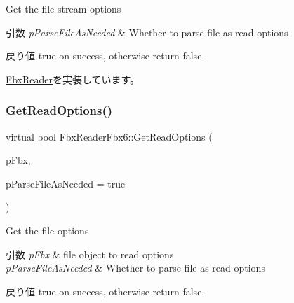Get the file stream options 
\begin{DoxyParams}{引数}
{\em p\+Parse\+File\+As\+Needed} & Whether to parse file as read options \\
\hline
\end{DoxyParams}
\begin{DoxyReturn}{戻り値}
true on success, otherwise return false. 
\end{DoxyReturn}


\hyperlink{class_fbx_reader_acea3c118db490378c9aed17512396932}{Fbx\+Reader}を実装しています。

\mbox{\label{class_fbx_reader_fbx6_aad5666cba24ae32ea43085227e8497fc}} 
\subsubsection{\texorpdfstring{Get\+Read\+Options()}{GetReadOptions()}\hspace{0.1cm}{\footnotesize\ttfamily [2/2]}}
{\footnotesize\ttfamily virtual bool Fbx\+Reader\+Fbx6\+::\+Get\+Read\+Options (\begin{DoxyParamCaption}\item[{\hyperlink{class_fbx_i_o}{Fbx\+IO} $\ast$}]{p\+Fbx,  }\item[{bool}]{p\+Parse\+File\+As\+Needed = {\ttfamily true} }\end{DoxyParamCaption})\hspace{0.3cm}{\ttfamily [virtual]}}

Get the file options 
\begin{DoxyParams}{引数}
{\em p\+Fbx} & file object to read options \\
\hline
{\em p\+Parse\+File\+As\+Needed} & Whether to parse file as read options \\
\hline
\end{DoxyParams}
\begin{DoxyReturn}{戻り値}
true on success, otherwise return false. 
\end{DoxyReturn}
\mbox{\label{class_fbx_reader_fbx6_a62e8d566653eccca7e4b7c914f7a9a5e}} 
